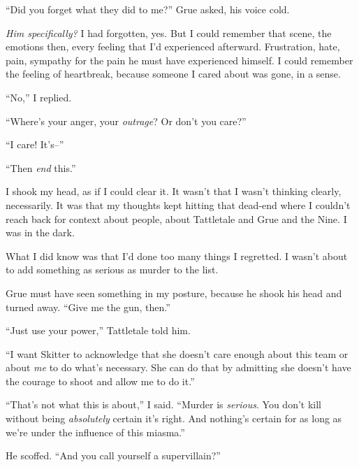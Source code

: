 ``Did you forget what they did to me?''  Grue asked, his voice cold.



\emph{Him specifically?  }I had forgotten, yes.\emph{  }But I could remember that scene, the emotions then, every feeling that I'd experienced afterward.  Frustration, hate, pain, sympathy for the pain he must have experienced himself.  I could remember the feeling of heartbreak, because someone I cared about was gone, in a sense.



``No,'' I replied.



``Where's your anger, your \emph{outrage}?  Or don't you care?''



``I care!  It's--''



``Then \emph{end} this.''



I shook my head, as if I could clear it.  It wasn't that I wasn't thinking clearly, necessarily.  It was that my thoughts kept hitting that dead-end where I couldn't reach back for context about people, about Tattletale and Grue and the Nine.  I was in the dark.



What I did know was that I'd done too many things I regretted.  I wasn't about to add something as serious as murder to the list.



Grue must have seen something in my posture, because he shook his head and turned away.  ``Give me the gun, then.''



``Just use your power,'' Tattletale told him.



``I want Skitter to acknowledge that she doesn't care enough about this team or about \emph{me} to do what's necessary.  She can do that by admitting she doesn't have the courage to shoot and allow me to do it.''



``That's not what this is about,'' I said.  ``Murder is \emph{serious}.  You don't kill without being \emph{absolutely} certain it's right.  And nothing's certain for as long as we're under the influence of this miasma.''



He scoffed.  ``And you call yourself a supervillain?''



